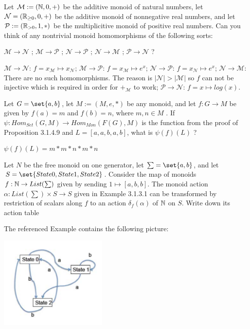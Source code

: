 \documentclass{article}
\begin{document}

Let $\mathcal{M} := (\mathbb{N}, 0, +)$ be the additive monoid of natural numbers, let
$\mathcal{N} = (\mathbb{R}_{\ge 0} , 0, +)$ be the additive monoid of nonnegative real
numbers, and let $\mathcal{P} := (\mathbb{R}_{>0} , 1, *)$ be the multiplicitive
monoid of positive real numbers. Can you think of any nontrivial monoid
homomorphisms of the following sorts:

$\mathcal{M} \to \mathcal{N}$ ;
$\mathcal{M} \to \mathcal{P}$ ;
$\mathcal{N} \to \mathcal{P}$ ;
$\mathcal{N} \to \mathcal{M}$ ;
$\mathcal{P} \to \mathcal{N}$ ?

\ans

\es $\mathcal{M} \to \mathcal{N}$: $f = x_{\mathcal{M}} \mapsto x_{\mathcal{N}}$;
\ei $\mathcal{M} \to \mathcal{P}$: $f = x_{\mathcal{M}} \mapsto e^x$;
\ei $\mathcal{N} \to \mathcal{P}$: $f = x_{\mathcal{N}} \mapsto e^x$;
\ei $\mathcal{N} \to \mathcal{M}$: There are no such homomorphisms. The reason
    is $|\mathcal{N}| > |\mathcal{M}|$ so $f$ can not be injective which is
    required in order for $+_{\mathcal{M}}$ to work;
\ei $\mathcal{P} \to \mathcal{N}$: $f = x \mapsto log(x)$.
\ee


Let $G = \set{a,b}$, let $M := (M, e, *)$ be any monoid, and let $f : G \to M$
be given by $f(a) = m$ and $f(b) = n$, where $m, n \in M$ . If $\psi :
Hom_{Set}(G, M) \to Hom_{Mon}(F(G), M)$ is the function from the proof of
Proposition 3.1.4.9 and $L = [a, a, b, a, b]$, what is $\psi(f)(L)$ ?

\ans

$\psi(f)(L) = m * m * n * m * n$


Let $N$ be the free monoid on one generator, let $\sum = \set{a, b}$, and let $S
= \set{State 0, State 1, State 2}$. Consider the map of monoids $f : \mathbb{N} \to
List(\sum)$ given by sending $1 \mapsto [a, b, b]$. The monoid action $\alpha :
List(\sum) \times S \to S$ given in Example 3.1.3.1 can be transformed by
restriction of scalars along $f$ to an action $\delta_f(\alpha)$ of $\mathbb{N}$ on
$S$. Write down its action table

\ans

The referenced Example contains the following picture:

\begin{center}
\includegraphics[width=0.4\textwidth]{img/finite-state-machine.png}
\end{center}
\end{document}
